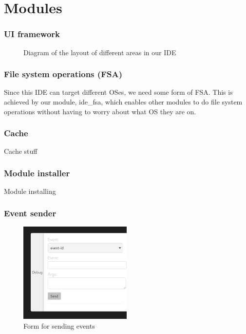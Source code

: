\section{Modules}
\SectionPage

\begin{frame}
  \frametitle{UI framework}
  \begin{figure}[H]
    \centering
    
    \caption{
      Diagram of the layout of different areas in our IDE
    }
    \label{fig:ideLayout}
  \end{figure}
\end{frame}

\begin{frame}
  \frametitle{File system operations (FSA)}
  Since this IDE can target different OSes, we
  need some form of FSA. This is achieved by our module, ide\_fsa, which
  enables other modules to do file system operations without having to worry about
  what OS they are on.
\end{frame}

\begin{frame}
  \frametitle{Cache}
  Cache stuff
\end{frame}

\begin{frame}
  \frametitle{Module installer}
  Module installing
\end{frame}

\begin{frame}
  \frametitle{Event sender}
  \begin{figure}
    \centering
    \includegraphics[width=0.5\textwidth]{./pics/event-mocking.png}
    \caption{
      Form for sending events
    }
  \end{figure}
\end{frame}

